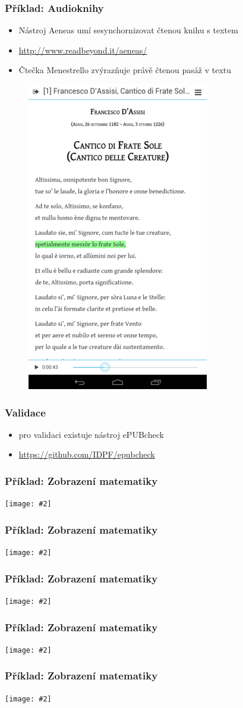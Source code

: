 \documentclass[czech]{beamer}
\newcommand\myfig[3][width=.9\textwidth]{%
  \figure\texttt{[image: \#2]}%
  \caption{#3}%
\endfigure}
\begin{document}
\begin{frame}
\frametitle{Příklad: Audioknihy}
\begin{itemize}
  \item Nástroj Aeneas umí sesynchornizovat čtenou knihu s textem
  \item \url{http://www.readbeyond.it/aeneas/}
  \item Čtečka Menestrello zvýrazňuje právě čtenou pasáž v textu
\end{itemize}
\begin{figure}
  \includegraphics[width=.3\textwidth]{examples/menestrello.png}
\end{figure}
\end{frame}
\begin{frame}
  \frametitle{Validace}
  \begin{itemize}
    \item pro validaci existuje nástroj ePUBcheck
    \item \url{https://github.com/IDPF/epubcheck}
  \end{itemize}
\end{frame}
\begin{frame}
  \frametitle{Příklad: Zobrazení matematiky}
  {\myfig{examples/png-epub.png}{Matematika ve formátu PNG. Azardi}}
\end{frame}
\begin{frame}
  \frametitle{Příklad: Zobrazení matematiky}
  {\myfig{examples/png-mobi.png}{Matematika ve formátu PNG. Kindle}}
\end{frame}
\begin{frame}
  \frametitle{Příklad: Zobrazení matematiky}
  \myfig{examples/svg-epub.png}{Matematika ve formátu SVG. Azardi}
\end{frame}
\begin{frame}
  \frametitle{Příklad: Zobrazení matematiky}
  \myfig[height=0.6\paperheight]{examples/svg-mobi.png}{Matematika ve formátu SVG. Kindle}
\end{frame}
\begin{frame}
  \frametitle{Příklad: Zobrazení matematiky}
  \myfig{examples/mathml-ade.png}{Matematika ve formátu MathML. ADE}
\end{frame}
\end{document}
